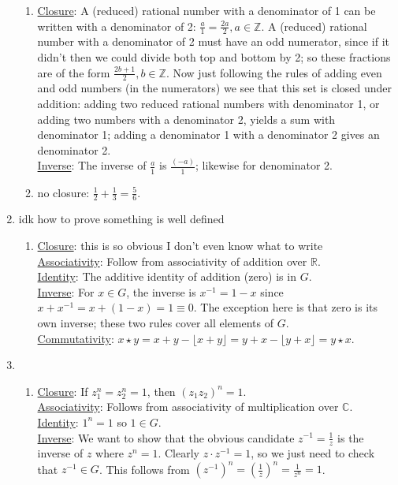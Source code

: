 \documentclass[]{article}
\newcommand{\bbz}{\mathbb{Z}}
\newcommand{\bbr}{\mathbb{R}}
\newcommand{\bbc}{\mathbb{C}}
\begin{document}
\begin{enumerate}
\begin{enumerate}
\item \underline{Closure}: A (reduced) rational number with a denominator of 1 can be written with a denominator of 2: $\frac{a}{1} = \frac{2a}{2}, a\in\bbz$. A (reduced) rational number with a denominator of 2 must have an odd numerator, since if it didn't then we could divide both top and bottom by 2; so these fractions are of the form $\frac{2b+1}{2}, b\in\bbz$. Now just following the rules of adding even and odd numbers (in the numerators) we see that this set is closed under addition: adding two reduced rational numbers with denominator 1, or adding two numbers with a denominator 2, yields a sum with denominator 1; adding a denominator 1 with a denominator 2 gives an denominator 2. \\
\underline{Inverse}: The inverse of $\frac{a}{1}$ is $\frac{(-a)}{1}$; likewise for denominator 2.
\item no closure: $\frac{1}{2} + \frac{1}{3} = \frac{5}{6}$.
\end{enumerate}
\item {\color{red} idk how to prove something is well defined}
\begin{enumerate}
\item \underline{Closure}: {\color{red} this is so obvious I don't even know what to write} \\
\underline{Associativity}: Follow from associativity of addition over $\bbr$.\\ 
\underline{Identity}: The additive identity of addition (zero) is in $G$.\\
\underline{Inverse}: For $x \in G$, the inverse is $x^{-1} = 1-x$ since $x+x^{-1} = x + (1-x) = 1 \equiv 0$. The exception here is that zero is its own inverse; these two rules cover all elements of $G$.\\
\underline{Commutativity}: $x\star y = x + y - \lfloor x+y \rfloor = y + x - \lfloor y+x \rfloor = y\star x$.
\end{enumerate}
\item \begin{enumerate}
\item \underline{Closure}: If $z_1^n = z_2^n = 1$, then $(z_1 z_2)^n = 1$. \\
\underline{Associativity}: Follows from associativity of multiplication over $\bbc$. \\ 
\underline{Identity}: $1^n = 1$ so $1 \in G$. \\
\underline{Inverse}: We want to show that the obvious candidate $z^{-1} = \frac{1}{z}$ is the inverse of $z$ where $z^n = 1$. Clearly $z \cdot z^{-1} = 1$, so we just need to check that $z^{-1} \in G$. This follows from $\left(z^{-1}\right)^ n = \left(\frac{1}{z}\right)^n = \frac{1}{z^n} = 1$.

\end{enumerate}
\end{enumerate}
\end{document}
